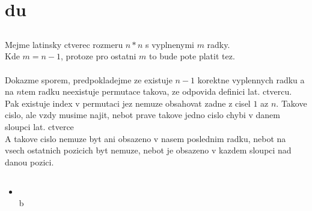 \documentclass[a4paper]{article}
\begin{document}
\pagestyle{fancy}

\setcounter{section}{1}
\section{du}
\subsection{}
Mejme latinsky ctverec rozmeru $n*n$ s vyplnenymi $m$ radky.\\
Kde $m = n-1$, protoze pro ostatni $m$ to bude pote platit tez.\\
\\
Dokazme sporem, predpokladejme ze existuje $n-1$ korektne vyplennych
radku a na $n$tem radku neexistuje permutace takova, ze odpovida definici
lat. ctvercu.\\
Pak existuje index v permutaci jez nemuze obsahovat zadne z cisel $1$ az $n$.
Takove cislo, ale vzdy musime najit,
nebot prave takove jedno cislo chybi v danem sloupci lat. ctverce\\
A takove cislo nemuze byt ani obsazeno v nasem poslednim radku, nebot na vsech ostatnich pozicich byt nemuze, nebot je obsazeno v kazdem sloupci nad danou pozici.

\subsection{}
\begin{itemize}
\item \\
b
\end{itemize}
 
\end{document}
